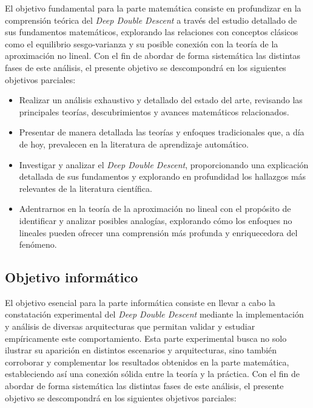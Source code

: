 El objetivo fundamental para la parte matemática consiste en profundizar en la comprensión teórica del \textit{Deep Double Descent} a través del estudio detallado de sus fundamentos matemáticos, explorando las relaciones con conceptos clásicos como el equilibrio sesgo-varianza y su posible conexión con la teoría de la aproximación no lineal. Con el fin de abordar de forma sistemática las distintas fases de este análisis, el presente objetivo se descompondrá en los siguientes objetivos parciales:

\begin{itemize}
    \item Realizar un análisis exhaustivo y detallado del estado del arte, revisando las principales teorías, descubrimientos y avances matemáticos relacionados.
    \item Presentar de manera detallada las teorías y enfoques tradicionales que, a día de hoy, prevalecen en la literatura de aprendizaje automático.
    \item Investigar y analizar el \textit{Deep Double Descent}, proporcionando una explicación detallada de sus fundamentos y explorando en profundidad los hallazgos más relevantes de la literatura científica.
    \item Adentrarnos en la teoría de la aproximación no lineal con el propósito de identificar y analizar posibles analogías, explorando cómo los enfoques no lineales pueden ofrecer una comprensión más profunda y enriquecedora del fenómeno.
\end{itemize}

\subsection{Objetivo informático}

El objetivo esencial para la parte informática consiste en llevar a cabo la constatación experimental del \textit{Deep Double Descent} mediante la implementación y análisis de diversas arquitecturas que permitan validar y estudiar empíricamente este comportamiento. Esta parte experimental busca no solo ilustrar su aparición en distintos escenarios y arquitecturas, sino también corroborar y complementar los resultados obtenidos en la parte matemática, estableciendo así una conexión sólida entre la teoría y la práctica. Con el fin de abordar de forma sistemática las distintas fases de este análisis, el presente objetivo se descompondrá en los siguientes objetivos parciales:

